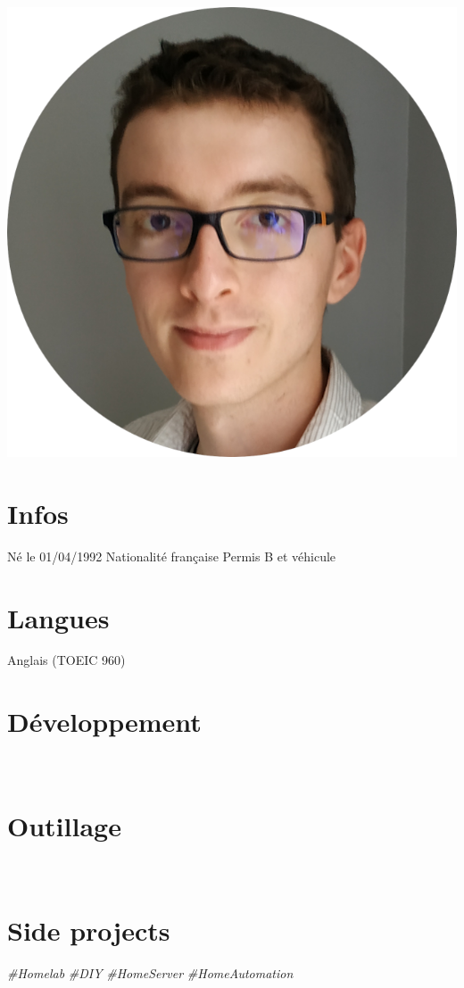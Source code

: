 \documentclass[]{friggeri-cv}
\begin{document}
\begin{aside}
  \includegraphics[scale=0.2]{../img/photo.png} 
    \section{Infos}
    Né le 01/04/1992
    Nationalité française
    Permis B et véhicule
    ~
  \section{Langues}
    Anglais (TOEIC 960)
    ~
  \section{Développement}
    ~
  \section{Outillage}
    ~
   \section{Side projects}
    \textit{\#Homelab}
    \textit{\#DIY}
    \textit{\#HomeServer}
    \textit{\#HomeAutomation}
    ~
\end{aside}
~
\\
\\
\end{document}

